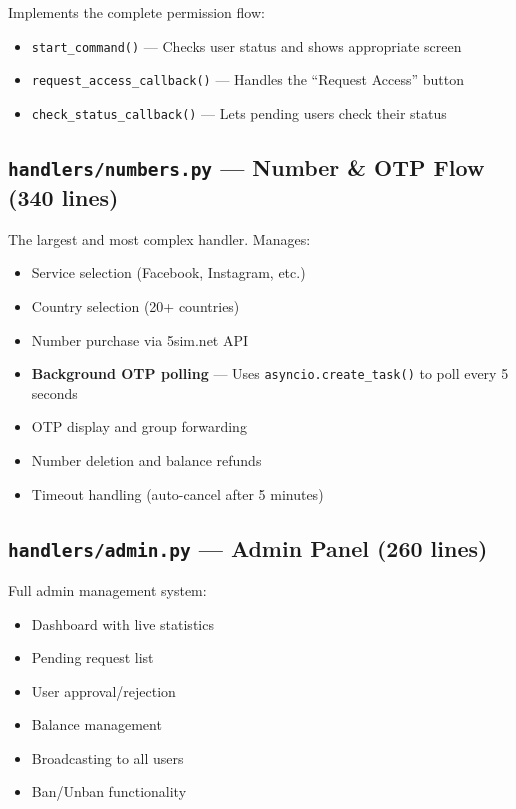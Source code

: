 Implements the complete permission flow:
\begin{itemize}
    \item \texttt{start\_command()} --- Checks user status and shows appropriate screen
    \item \texttt{request\_access\_callback()} --- Handles the ``Request Access'' button
    \item \texttt{check\_status\_callback()} --- Lets pending users check their status
\end{itemize}

\subsection{\texttt{handlers/numbers.py} --- Number \& OTP Flow (340 lines)}

The largest and most complex handler. Manages:
\begin{itemize}
    \item Service selection (Facebook, Instagram, etc.)
    \item Country selection (20+ countries)
    \item Number purchase via 5sim.net API
    \item \textbf{Background OTP polling} --- Uses \texttt{asyncio.create\_task()} to poll every 5 seconds
    \item OTP display and group forwarding
    \item Number deletion and balance refunds
    \item Timeout handling (auto-cancel after 5 minutes)
\end{itemize}

\subsection{\texttt{handlers/admin.py} --- Admin Panel (260 lines)}

Full admin management system:
\begin{itemize}
    \item Dashboard with live statistics
    \item Pending request list
    \item User approval/rejection
    \item Balance management
    \item Broadcasting to all users
    \item Ban/Unban functionality
\end{itemize}

